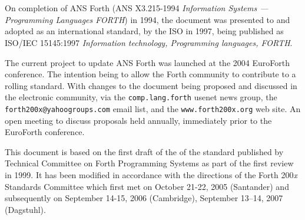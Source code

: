 \chapter*{}
\label{foreword}


On completion of ANS Forth (ANS X3.215-1994 \emph{Information Systems
--- Programming Languages FORTH}) in 1994, the document was presented
to and adopted as an international standard, by the ISO in 1997, being
published as ISO/IEC 15145:1997 \emph{Information technology,
Programming languages, FORTH}.

The current project to update ANS Forth was launched at the 2004
EuroForth conference.  The intention being to allow the Forth community
to contribute to a rolling standard.  With changes to the document
being proposed and discussed in the electronic community, via the
\texttt{comp.lang.forth} usenet news group, the
\texttt{forth200x@yahoogroups.com} email list, and the
\texttt{www.forth200x.org} web site.  An open meeting to discuss
proposals  held annually, immediately prior to the EuroForth
conference.

This document is based on the first draft of the of the standard
published by Technical Committee on Forth Programming Systems as part
of the first review in 1999. It has been modified in accordance with
the directions of the Forth 200\emph{x} Standards Committee which first
met on October 21-22, 2005 (Santander) and subsequently on
September 14-15, 2006 (Cambridge),
September 13--14, 2007 (Dagstuhl).
